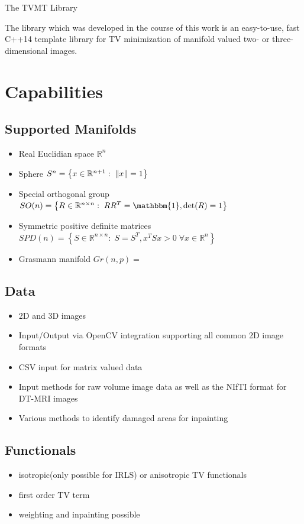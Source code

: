 \begin{chapter}{The TVMT Library}
\label{ch:library}

The library which was developed in the course of this work is an easy-to-use, fast C++14 template library for TV minimization of manifold valued two- or three-dimensional images.

\section{Capabilities} %
\label{sec:Capabilities}
\subsection{Supported Manifolds} %
\label{sub:Supported Manifolds}
\begin{itemize}
    \item Real Euclidian space $\mathbb{R}^n$
    \item Sphere $S^n=\left\lbrace x\in\mathbb{R}^{n+1}:\; \| x \|=1\right\rbrace$
    \item Special orthogonal group $SO(n)=\left\lbrace R\in\mathbb{R}^{n\times n}:\; RR^T=\mathbbm{1}, \operatorname{det}(R)=1 \right\rbrace$
    \item Symmetric positive definite matrices $SPD(n)=\left\lbrace S\in\mathbb{R}^{n\times n}:\; S=S^T, x^TSx>0\; \forall x\in\mathbb{R}^n \right\rbrace$
    \item Grasmann manifold $Gr(n,p)=$
\end{itemize}

\subsection{Data} %
\label{sub:Data}
\begin{itemize}
	\item 2D and 3D images
	\item Input/Output via OpenCV integration supporting all common 2D image formats
	\item CSV input for matrix valued data
	\item Input methods for raw volume image data as well as the NIfTI \cite{nifti} format for DT-MRI images
	\item Various methods to identify damaged areas for inpainting
\end{itemize}

\subsection{Functionals} %
\label{sub:Functionals}
\begin{itemize}
    \item isotropic(only possible for IRLS) or anisotropic TV functionals
    \item first order TV term
    \item weighting and inpainting possible
\end{itemize}


\end{chapter}

